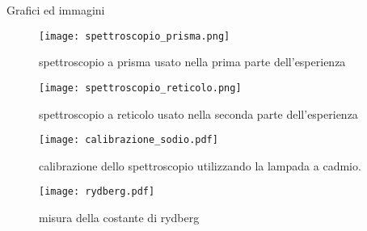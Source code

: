 \begin{section}{Grafici ed immagini}
\begin{figure}[h]
	\centering
	\texttt{[image: spettroscopio\_prisma.png]}
	\caption{spettroscopio a prisma usato nella prima parte dell'esperienza}
	\label{f:spettroscopio_prisma}
\end{figure}

\begin{figure}[h]
	\centering
	\texttt{[image: spettroscopio\_reticolo.png]}
	\caption{spettroscopio a reticolo usato nella seconda parte dell'esperienza}
	\label{f:spettroscopio_reticolo}
\end{figure}


\begin{figure}[h]
	\centering
	\texttt{[image: calibrazione\_sodio.pdf]}
	\caption{calibrazione dello spettroscopio utilizzando la lampada a cadmio.}
	\label{f:calibrazione_cadmio}
\end{figure}


\begin{figure}[h]
	\centering
	\texttt{[image: rydberg.pdf]}
	\caption{misura della costante di rydberg}
	\label{f:rydberg}
\end{figure}

\end{section}